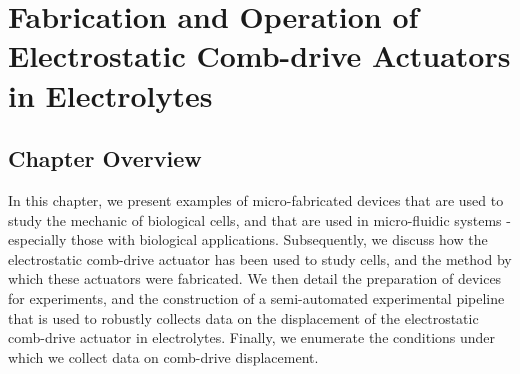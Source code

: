 
\chapter{Fabrication and Operation of Electrostatic Comb-drive Actuators in Electrolytes}

\ifpdf
    \graphicspath{{Chapter2/Figs/Raster/}{Chapter2/Figs/PDF/}{Chapter2/Figs/}}
\else
    \graphicspath{{Chapter2/Figs/Vector/}{Chapter2/Figs/}}
\fi


\section[Short title]{Chapter Overview}
In this chapter, we present examples of micro-fabricated devices that are used to study the mechanic of biological cells, and that are used in micro-fluidic systems - especially those with biological applications. Subsequently, we discuss how the electrostatic comb-drive actuator has been used to study cells, and the method by which these actuators were fabricated. We then detail the preparation of devices for experiments, and the construction of a semi-automated experimental pipeline that is used to robustly collects data on the displacement of the electrostatic comb-drive actuator in electrolytes. Finally, we enumerate the conditions under which we collect data on comb-drive displacement.




